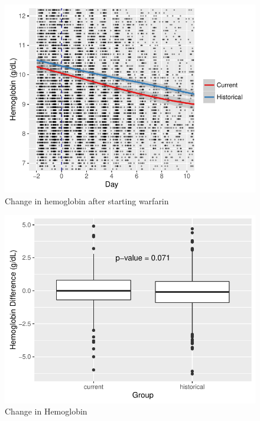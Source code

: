 \documentclass[]{article}
\begin{document}
\begin{figure}[H]
\centering
\includegraphics{warfarin_analysis_ASHP_files/figure-latex/hgb_hist-1.pdf}
\caption{Change in hemoglobin after starting warfarin}
\end{figure}

\begin{figure}[H]
\centering
\includegraphics{warfarin_analysis_ASHP_files/figure-latex/hgb2_hist-1.pdf}
\caption{Change in Hemoglobin}
\end{figure}
\end{document}
